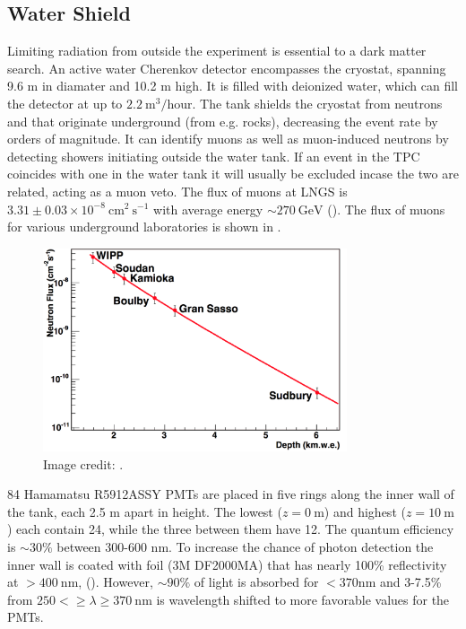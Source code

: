 \subsection{Water Shield}
\label{subsec:xenon1t_water_shield}
Limiting radiation from outside the experiment is essential to a dark matter search.  An active water Cherenkov detector encompasses the
cryostat, spanning 9.6 m in diamater and 10.2 m high.  It is filled with deionized water, which can fill the detector at up to
$2.2\ \mathrm{m^{3}/hour}$.  The tank shields the cryostat from neutrons and \gammarays that originate underground (from e.g. rocks),
decreasing the event rate by orders of magnitude.  It can identify muons as well as muon-induced neutrons by detecting showers initiating
outside the water tank.  If an event in the TPC coincides with one in the water tank it will usually be excluded incase the two are
related, acting as a muon veto.  The flux of muons at LNGS is $3.31 \pm 0.03 \times 10^{-8}\ \mathrm{cm^2\ s^{-1}}$ with average energy
${\sim}270\ \mathrm{GeV}$ ().  The flux of muons for various underground laboratories is shown in
.

\begin{figure}
\centering
\includegraphics[width=0.8\textwidth]{MuonFluxOverDepth}
\caption{Image credit: .}
\label{fig:xenon1t_water_shield_flux}
\end{figure}

84 Hamamatsu R5912ASSY PMTs are placed in five rings along the inner wall of the tank, each 2.5 m apart in height.  The lowest
($z = 0\ \mathrm{m}$) and highest ($z = 10\ \mathrm{m}$) each contain 24, while the three between them have 12.  The quantum efficiency
is ${\sim}30\%$ between 300-600 nm.  To increase the chance of photon detection the inner wall is coated with foil (3M DF2000MA) that has
nearly 100\% reflectivity at $> 400\ \mathrm{nm}$, ().  However, ${\sim}90\%$ of light is absorbed for $<370 \mathrm{nm}$
and 3-7.5\% from $250 < \geq \lambda \geq 370\ \mathrm{nm}$ is wavelength shifted to more favorable values for the PMTs.

